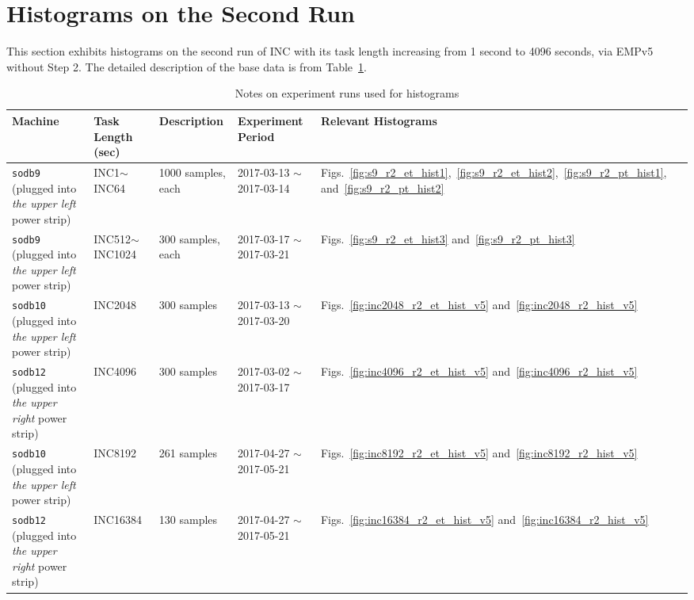 \section{Histograms on the Second Run~\label{sec:sodb9_r2_hist}} 
This section exhibits histograms on the second run of 
INC with its task length increasing from 1 second to 4096 seconds, via EMPv5 without Step 2. 
The detailed description of the base data is from Table~\ref{tab:exp_notes2}.

\begin{table}[h]
\begin{center}
\begin{tabular}{|p{2cm}|p{3cm}|p{3cm}|p{4cm}|p{3.5cm}|} \hline
Machine & Task Length (sec) & Description & Experiment Period & Relevant \linebreak Histograms\\ \hline
{\tt sodb9} (plugged into {\em the upper left} power strip) &  INC1$\sim$INC64 & 1000 samples, each & 2017-03-13 $\sim$ 2017-03-14 & Figs.~\ref{fig:s9_r2_et_hist1},~\ref{fig:s9_r2_et_hist2},~\ref{fig:s9_r2_pt_hist1}, and~\ref{fig:s9_r2_pt_hist2}\\ \hline
{\tt sodb9} (plugged into {\em the upper left} power strip) &  INC512$\sim$INC1024 & 300 samples, each & 2017-03-17 $\sim$ 2017-03-21 & 
Figs.~\ref{fig:s9_r2_et_hist3} and~\ref{fig:s9_r2_pt_hist3}\\ \hline
{\tt sodb10} (plugged into {\em the upper left} power strip) & INC2048 & 300 samples & 2017-03-13 $\sim$ 2017-03-20 & Figs.~\ref{fig:inc2048_r2_et_hist_v5} and~\ref{fig:inc2048_r2_hist_v5}\\ \hline
{\tt sodb12} (plugged into {\em the upper right} power strip) & INC4096 & 300 samples & 2017-03-02 $\sim$ 2017-03-17 & Figs.~\ref{fig:inc4096_r2_et_hist_v5} and~\ref{fig:inc4096_r2_hist_v5}\\ \hline
{\tt sodb10} (plugged into {\em the upper left} power strip) & INC8192& 261 samples & 2017-04-27 $\sim$ 2017-05-21 & Figs.~\ref{fig:inc8192_r2_et_hist_v5} and~\ref{fig:inc8192_r2_hist_v5}\\ \hline
{\tt sodb12} (plugged into {\em the upper right} power strip) & INC16384& 130 samples & 2017-04-27 $\sim$ 2017-05-21 & Figs.~\ref{fig:inc16384_r2_et_hist_v5} and~\ref{fig:inc16384_r2_hist_v5}\\ \hline
\end{tabular}
\end{center}
\vspace{-.2in}
\caption{Notes on experiment runs used for histograms\label{tab:exp_notes2}}
\end{table}

